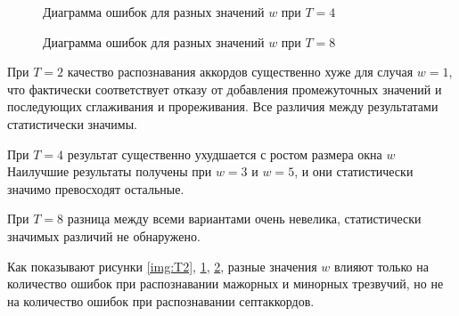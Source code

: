 \begin{figure}[htbp]
  \begin{minipage}[h]{0.49\linewidth}
  \end{minipage}
  \hfill
  \begin{minipage}[h]{0.49\linewidth}
  \end{minipage}
  \caption{Диаграмма ошибок для разных значений $w$ при $T=4$}
  \label{img:T4}
\end{figure}

\begin{figure}[htbp]
  \begin{minipage}[h]{0.49\linewidth}
  \end{minipage}
  \hfill
  \begin{minipage}[h]{0.49\linewidth}
  \end{minipage}
  \caption{Диаграмма ошибок для разных значений $w$ при $T=8$}
  \label{img:T8}
\end{figure}

При $T=2$ качество распознавания аккордов существенно хуже для случая $w=1$, что
фактически соответствует отказу от добавления промежуточных значений и
последующих сглаживания и прореживания. Все различия между результатами
статистически значимы.

При $T=4$ результат существенно ухудшается с ростом размера окна $w$ Наилучшие
результаты получены при $w=3$ и $w=5$, и они статистически значимо превосходят
остальные.

При $T=8$ разница между всеми вариантами очень невелика, статистически значимых
различий не обнаружено.

Как показывают рисунки \ref{img:T2}, \ref{img:T4}, \ref{img:T8}, разные значения
$w$ влияют только на количество ошибок при распознавании мажорных и минорных
трезвучий, но не на количество ошибок при распознавании септаккордов.

% 

